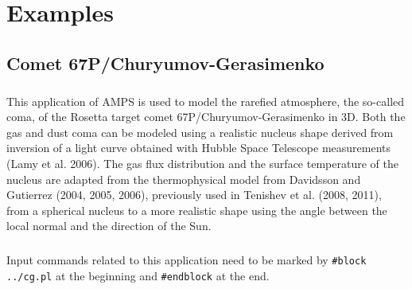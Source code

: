 \chapter{Examples}


\section{Comet 67P/Churyumov-Gerasimenko}

\paragraph{}
This application of AMPS is used to model the rarefied atmosphere, the so-called coma, of the Rosetta target comet 67P/Churyumov-Gerasimenko in 3D. Both the gas and dust coma can be modeled using a realistic nucleus shape derived from inversion of a light curve obtained with Hubble Space Telescope measurements (Lamy et al. 2006). The gas flux distribution and the surface temperature of the nucleus are adapted from the thermophysical model from Davidsson and Gutierrez (2004, 2005, 2006), previously used in Tenishev et al. (2008, 2011), from a spherical nucleus to a more realistic shape using the angle between the local normal and the direction of the Sun.

\paragraph{}
Input commands related to this application need to be marked by {\tt \#block ../cg.pl} at the beginning and {\tt \#endblock} at the end.

